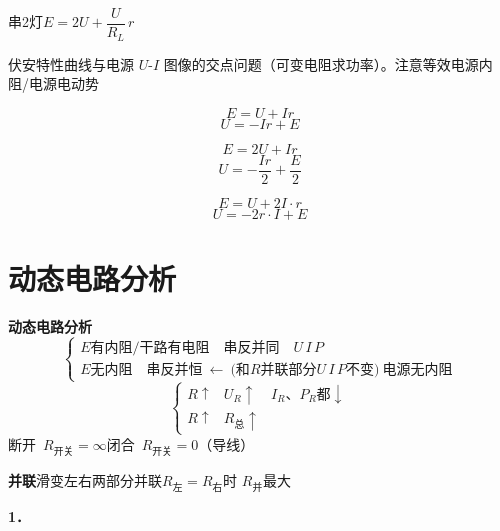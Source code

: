 串2灯\quad $E=2U+\dfrac{U}{R_L}\,r$


伏安特性曲线与电源 $U$-$I$ 图像的交点问题（可变电阻求功率）。\quad 注意等效电源内阻/电源电动势


\[ E=U+Ir \]
\[ U=-Ir+E \]



\[ E=2U+Ir \]
\[ U=-\frac{Ir}{2}+\frac{E}{2} \]


\[ E=U+2I\cdot r \]
\[ U=-2r\cdot I+E \]


\section{动态电路分析}
\textbf{动态电路分析}
\[
\left\{\begin{array}{l}
\text{$E$有内阻/干路有电阻}\quad\text{串反并同}\quad U\,I\,P\\[4pt]
\text{$E$无内阻}\quad\text{串反并恒}\ \leftarrow\ \text{(和$R$并联部分$U\,I\,P$不变)}\ \text{电源无内阻}
\end{array}\right.
\]
\[
\left\{\begin{array}{lll}
R\uparrow & U_R\uparrow & I_R\text{、}P_R\text{都}\downarrow\\[4pt]
R\uparrow & R_{\text{总}}\uparrow &
\end{array}\right.
\]
断开\ $R_{\text{开关}}=\infty$\quad {}闭合\ $R_{\text{开关}}=0$（导线）

\textbf{并联}\quad 滑变左右两部分并联\quad $R_{\text{左}}=R_{\text{右}}$时 $R_{\text{并}}$最大


\textbf{1．}


